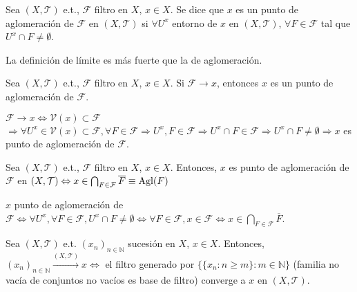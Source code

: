 \begin{defn}[Aglomeración]  
  Sea $( X, \mathcal{T} )$ e.t., $\mathcal{F}$ filtro en $X$, $x \in X$. Se dice que $x$ es un punto de aglomeración de $\mathcal{F}$ en $( X, \mathcal{T} )$ si $\forall U^{x}$ entorno de $x$ en $( X, \mathcal{T} )$, $\forall F \in \mathcal{F}$ tal que $U^{x} \cap F \neq \emptyset$.
\end{defn}

\begin{obs}
  La definición de límite es más fuerte que la de aglomeración.
\end{obs}

\begin{prop}
  Sea $( X, \mathcal{T} )$ e.t., $\mathcal{F}$ filtro en $X$, $x \in X$. Si $\mathcal{F} \rightarrow x$, entonces $x$ es un punto de aglomeración de $\mathcal{F}$.
\end{prop}

\begin{dem}
  $\mathcal{F} \rightarrow x \Leftrightarrow \mathcal{V}(x) \subset \mathcal{F}$ $\Rightarrow \forall U^x \in \mathcal{V}(x) \subset \mathcal{F}, \forall F \in \mathcal{F} \Rightarrow U^{x}, F \in \mathcal{F} \Rightarrow U^{x} \cap F \in \mathcal{F} \Rightarrow U^{x} \cap F \neq \emptyset \Rightarrow x$ es punto de aglomeración de $\mathcal{F}$.
\end{dem}

\begin{prop}
  Sea $( X, \mathcal{T} )$ e.t., $\mathcal{F}$ filtro en $X$, $x \in X$. Entonces, $x$ es punto de aglomeración de $\mathcal{F}$ en $( X, \mathcal{T} ) \Leftrightarrow x \in \bigcap_{F \in \mathcal{F}} \overline{F} \equiv \operatorname{Agl}(F)$
\end{prop}

\begin{dem}
  $x$ punto de aglomeración de $\mathcal{F} \Leftrightarrow \forall U^{x}, \forall F \in \mathcal{F}, U^{x} \cap F \neq \emptyset \Leftrightarrow \forall F \in \mathcal{F}, x \in \mathcal{F} \Leftrightarrow x \in \bigcap_{F \in \mathcal{F}} \overline{F}$.
\end{dem}

\begin{prop}
  Sea $( X, \mathcal{T} )$ e.t. $( x_{n} )_{n \in \mathbb{N}}$ sucesión en $X$, $x \in X$. Entonces, $( x_{n} )_{n \in \mathbb{N}} \xrightarrow[]{ ( X, \mathcal{T} ) } x \Leftrightarrow$ el filtro generado por $\{ \{ x_{n} : n \geq m \} : m \in \mathbb{N} \}$ (familia no vacía de conjuntos no vacíos es base de filtro) converge a $x$ en $( X, \mathcal{T} )$.
\end{prop}

